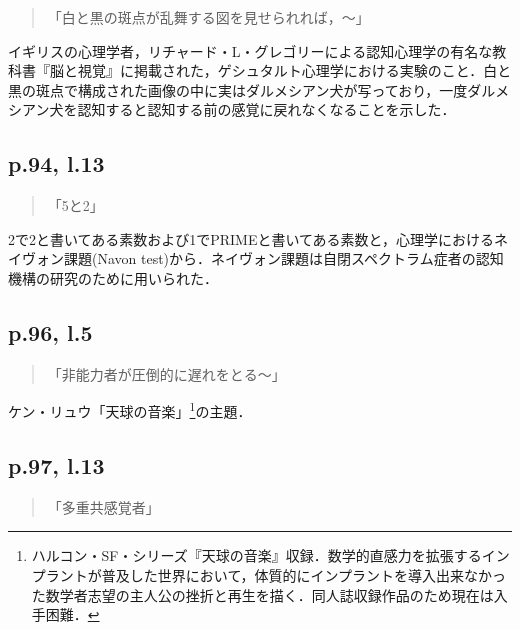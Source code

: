 \documentclass[10pt, a5paper, twoside]{jsarticle}
\theoremstyle{definition}
\begin{document}
			\begin{quote}

				「白と黒の斑点が乱舞する図を見せられれば，〜」

			\end{quote}

			イギリスの心理学者，リチャード・L・グレゴリーによる認知心理学の有名な教科書『脳と視覚』\cite{gre}に掲載された，ゲシュタルト心理学における実験のこと．白と黒の斑点で構成された画像の中に実はダルメシアン犬が写っており，一度ダルメシアン犬を認知すると認知する前の感覚に戻れなくなることを示した．

		\subsection{p.94, l.13}

			\begin{quote}

				「5と2」

			\end{quote}

			2で2と書いてある素数\cite{seisu,2of2}および1でPRIMEと書いてある素数\cite{seisu,prime}と，心理学におけるネイヴォン課題(Navon test)から．ネイヴォン課題は自閉スペクトラム症者の認知機構の研究のために用いられた\cite{ide}．

		\subsection{p.96, l.5}

			\begin{quote}

				「非能力者が圧倒的に遅れをとる〜」
				
			\end{quote}

			ケン・リュウ「天球の音楽」\footnote{ハルコン・SF・シリーズ『天球の音楽』収録．数学的直感力を拡張するインプラントが普及した世界において，体質的にインプラントを導入出来なかった数学者志望の主人公の挫折と再生を描く．同人誌収録作品のため現在は入手困難．}の主題．

		\subsection{p.97, l.13}

			\begin{quote}

				「多重共感覚者」
				
			\end{quote}
\end{document}
